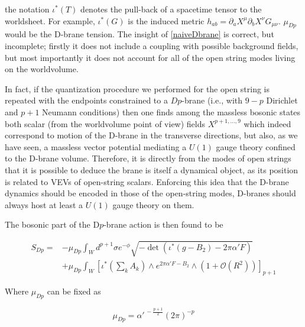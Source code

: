 the notation $\iota^*(T)$ denotes the pull-back of a spacetime tensor to the worldsheet. For example, $\iota^*(G)$ is the induced metric $h_{ab} = \partial_a X^\mu \partial_b X^\nu G_{\mu\nu}$. $\mu_{Dp}$ would be the D-brane tension. The insight of \eqref{naiveDbrane} is correct, but incomplete; firstly it does not include a coupling with possible background fields, but most importantly it does not account for all of the open string modes living on the worldvolume.

In fact, if the quantization procedure we performed for the open string is repeated with the endpoints constrained to a $Dp$-brane (i.e., with $9-p$ Dirichlet and $p+1$ Neumann conditions) then one finds among the massless bosonic states both scalar (from the worldvolume point of view) fields $X^{p+1,\ldots,9}$ which indeed correspond to motion of the D-brane in the transverse directions, but also, as we have seen, a massless vector potential mediating a $U(1)$ gauge theory confined to the D-brane volume. Therefore, it is directly from the modes of open strings that it is possible to deduce the brane is itself a dynamical object, as its position is related to VEVs of open-string scalars. Enforcing this idea that the D-brane dynamics should be encoded in those of the open-string modes, D-branes should always host at least a $U(1)$ gauge theory on them.


The bosonic part of the D$p$-brane action is then found to be


\begin{align}
	S_{Dp} = & -\mu_{Dp} \int_W d^{p+1}\sigma e^{-\phi} \sqrt{ - \det \left( \iota^{*}(g - B_2) - 2\pi\alpha' F \right)} \label{actionDBI}\\
& + \mu_{Dp} \int_W \left[ \iota^{*}\left(\sum_k A_k \right) \wedge e^{2\pi\alpha'F-B_2} \wedge (1 + \mathcal{O}(R^2))
\right]_{p+1} 	\label{actionCS}
\end{align}

Where $\mu_{Dp}$ can be fixed as 

\begin{equation}
	\mu_{Dp} = \alpha'^{\,-\frac{p+1}2}(2\pi)^{-p}
	\label{}
\end{equation}

